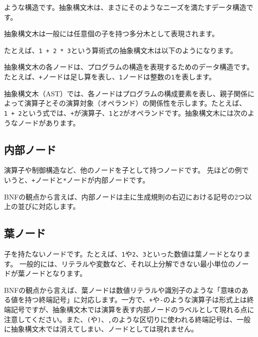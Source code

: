 \noindent ような構造です。抽象構文木は、まさにそのようなニーズを満たすデータ構造です。

抽象構文木は一般には任意個の子を持つ多分木として表現されます。

たとえば、\texttt{1\ +\ 2\ *\ 3}という算術式の抽象構文木は以下のようになります。

\begin{center}
\end{center}

抽象構文木の各ノードは、プログラムの構造を表現するためのデータ構造です。たとえば、\texttt{+}ノードは足し算を表し、\texttt{1}ノードは整数の\texttt{1}を表します。

抽象構文木（AST）では、各ノードはプログラムの構成要素を表し、親子関係によって演算子とその演算対象（オペランド）の関係性を示します。たとえば、\texttt{1\ +\ 2}という式では、\texttt{+}が演算子、\texttt{1}と\texttt{2}がオペランドです。抽象構文木には次のようなノードがあります。

\subsection{内部ノード}

演算子や制御構造など、他のノードを子として持つノードです。
先ほどの例でいうと、\texttt{+}ノードと\texttt{*}ノードが内部ノードです。

BNFの観点から言えば、内部ノードは主に生成規則の右辺における記号の2つ以上の並びに対応します。

\subsection{葉ノード}

子を持たないノードです。たとえば、\texttt{1}や\texttt{2}、\texttt{3}といった数値は葉ノードとなります。
一般的には、リテラルや変数など、それ以上分解できない最小単位のノードが葉ノードとなります。

BNFの観点から言えば、葉ノードは数値リテラルや識別子のような「意味のある値を持つ終端記号」に対応します。一方で、\texttt{+}や\texttt{-}のような演算子は形式上は終端記号ですが、抽象構文木では演算を表す内部ノードのラベルとして現れる点に注意してください。また、\texttt{(}や\texttt{)}、\texttt{,}のような区切りに使われる終端記号は、一般に抽象構文木では消えてしまい、ノードとしては現れません。

